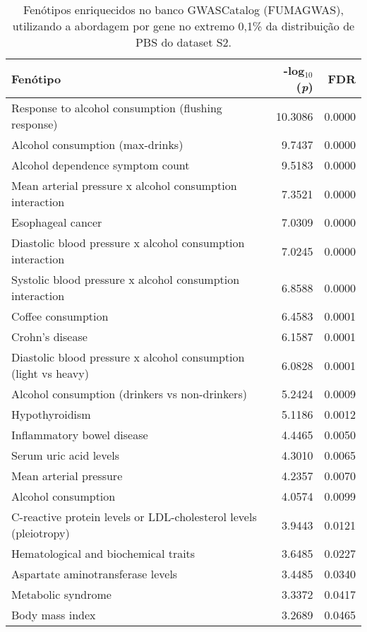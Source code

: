 \begin{table}[!htbp]
\centering

\begin{tabularx}{\linewidth}{Xrr}
\toprule
Fenótipo & -log$_{10}$(\emph{p}) & FDR\\
\midrule
Response to alcohol consumption (flushing response) & 10.3086 & 0.0000\\
Alcohol consumption (max-drinks) & 9.7437 & 0.0000\\
Alcohol dependence symptom count & 9.5183 & 0.0000\\
Mean arterial pressure x alcohol consumption interaction  & 7.3521 & 0.0000\\
Esophageal cancer & 7.0309 & 0.0000\\
Diastolic blood pressure x alcohol consumption interaction  & 7.0245 & 0.0000\\
Systolic blood pressure x alcohol consumption interaction  & 6.8588 & 0.0000\\
Coffee consumption & 6.4583 & 0.0001\\
Crohn's disease & 6.1587 & 0.0001\\
Diastolic blood pressure x alcohol consumption (light vs heavy)  & 6.0828 & 0.0001\\
Alcohol consumption (drinkers vs non-drinkers) & 5.2424 & 0.0009\\
Hypothyroidism & 5.1186 & 0.0012\\
Inflammatory bowel disease & 4.4465 & 0.0050\\
Serum uric acid levels & 4.3010 & 0.0065\\
Mean arterial pressure & 4.2357 & 0.0070\\
Alcohol consumption & 4.0574 & 0.0099\\
C-reactive protein levels or LDL-cholesterol levels (pleiotropy) & 3.9443 & 0.0121\\
Hematological and biochemical traits & 3.6485 & 0.0227\\
Aspartate aminotransferase levels & 3.4485 & 0.0340\\
Metabolic syndrome & 3.3372 & 0.0417\\
Body mass index & 3.2689 & 0.0465\\
\bottomrule
\end{tabularx}

\caption{Fenótipos enriquecidos no banco GWASCatalog (FUMAGWAS), utilizando a abordagem por gene no extremo 0,1\% da distribuição de PBS do dataset S2.}
\label{tab:ds2_fumagwas_pbs_pergene}

\end{table}